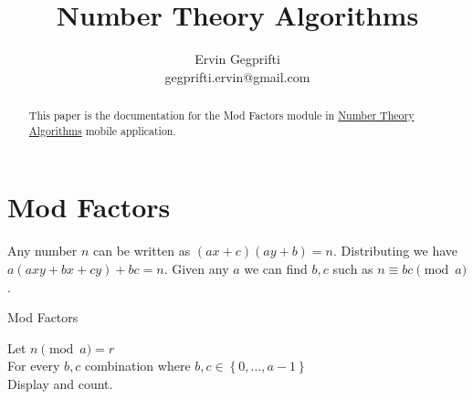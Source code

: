 \documentclass[12pt,oneside,a4paper]{article}
\title{Number Theory Algorithms}
\author{Ervin Gegprifti \\ [6pt]
	gegprifti.ervin@gmail.com}
\date{}
\begin{document}
\pagecolor{bgcolor}
	
\maketitle

\begin{abstract}
	This paper is the documentation for the Mod Factors module in \href{https://play.google.com/store/apps/details?id=com.gegprifti.android.numbertheoryalgorithms}{Number Theory Algorithms} mobile application.
\end{abstract}

\section*{Mod Factors}	
Any number $n$ can be written as $(ax+c)(ay+b)=n$. Distributing we have	$a(axy+bx+cy) + bc=n$. Given any $a$ we can find $b,c$ such as $n \equiv bc \pmod{a}$. \\




\begin{algorithm}[H]
	\caption{Mod Factors}
	\DontPrintSemicolon
	\SetAlgoLined
	
	\BlankLine
	
	Let $n \pmod{a} = r$ \\
	For every $b,c$ combination where $b,c \in \left\{0, \dots, a-1\right\}$ \\
	 { Display and count. }
	
\end{algorithm}
\end{document}
